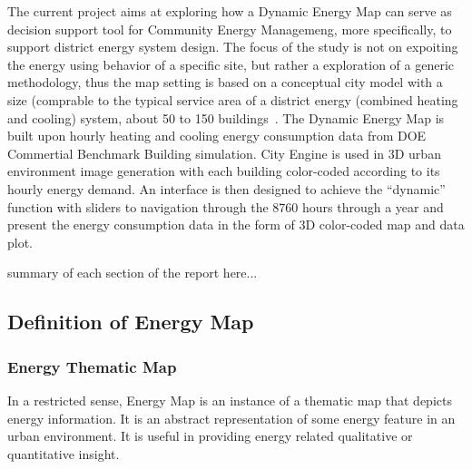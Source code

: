 \documentclass[hidelinks,12pt]{article}
\newcommand{\grey}[1]{\textcolor{black!30}{#1}}
\begin{document}
The current project aims at exploring how a Dynamic Energy Map can
serve as decision support tool for Community Energy Managemeng, more
specifically, to support district energy system design. The focus of
the study is not on expoiting the energy using behavior of a specific
site, but rather a exploration of a generic methodology, thus the map
setting is based on a conceptual city model with a size (comprable to
the typical service area of a district energy (combined heating and
cooling) system, about 50 to 150 buildings~\cite{IDEA2005}. The Dynamic
Energy Map is built upon hourly heating and cooling energy consumption
data from DOE Commertial Benchmark Building simulation. City Engine is
used in 3D urban environment image generation with each building
color-coded according to its hourly energy demand. An interface is
then designed to achieve the ``dynamic'' function with sliders to
navigation through the 8760 hours through a year and present the
energy consumption data in the form of 3D color-coded map and data
plot.

\grey{summary of each section of the report here...}

\subsection{Definition of Energy Map}
\subsubsection{Energy Thematic Map}
In a restricted sense, Energy Map is an instance of a thematic map
that depicts energy information. It is an abstract representation of
some energy feature in an urban environment. It is useful in providing
energy related qualitative or quantitative insight. 
\end{document}
